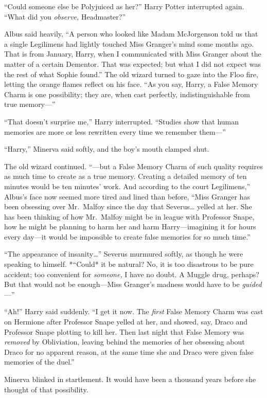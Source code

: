 ``Could someone else be Polyjuiced as her?'' Harry Potter interrupted
again. ``What did you \emph{observe,} Headmaster?''

Albus said heavily, ``A person who looked like Madam McJorgenson told us
that a single Legilimens had lightly touched Miss Granger's mind some
months ago. That is from January, Harry, when I communicated with Miss
Granger about the matter of a certain Dementor. That was expected; but
what I did not expect was the rest of what Sophie found.'' The old
wizard turned to gaze into the Floo fire, letting the orange flames
reflect on his face. ``As you say, Harry, a False Memory Charm is one
possibility; they are, when cast perfectly, indistinguishable from true
memory---''

``That doesn't surprise me,'' Harry interrupted. ``Studies show that
human memories are more or less rewritten every time we remember
them---''

``Harry,'' Minerva said softly, and the boy's mouth clamped shut.

The old wizard continued. ``---but a False Memory Charm of such quality
requires as much time to create as a true memory. Creating a detailed
memory of ten minutes would be ten minutes' work. And according to the
court Legilimens,'' Albus's face now seemed more tired and lined than
before, ``Miss Granger has been obsessing over Mr.~Malfoy since the day
that Severus\ldots{} yelled at her. She has been thinking of how
Mr.~Malfoy might be in league with Professor Snape, how he might be
planning to harm her and harm Harry---imagining it for hours every
day---it would be impossible to create false memories for so much
time.''

``The appearance of insanity\ldots{}'' Severus murmured softly, as
though he were speaking to himself. *``Could* it be natural? No, it is
too disastrous to be pure accident; too convenient for \emph{someone,} I
have no doubt. A Muggle drug, perhaps? But that would not be
enough---Miss Granger's madness would have to be \emph{guided}---''

``Ah!'' Harry said suddenly. ``I get it now. The \emph{first} False
Memory Charm was cast on Hermione after Professor Snape yelled at her,
and showed, say, Draco and Professor Snape plotting to kill her. Then
last night that False Memory was \emph{removed} by Obliviation, leaving
behind the memories of her obsessing about Draco for no apparent reason,
at the same time she and Draco were given false memories of the duel.''

Minerva blinked in startlement. It would have been a thousand years
before she thought of that possibility.

